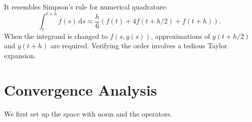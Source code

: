 \documentclass[10pt]{amsart}
\begin{document}
It resembles Simpson's rule for numerical quadrature:  
\[
\int_{t}^{t+h} f(s)\,\mathrm{d}s \approx \frac{h}{6} \left(f(t) + 4f(t+h/2) + f(t+h)\right).  
\]  
When the integrand is changed to $f(s, y(s))$, approximations of $y(t+h/2)$ and $y(t+h)$ are required. Verifying the order involves a tedious Taylor expansion.  

\section{Convergence Analysis}
We first set up the space with norm and the operators. 
\end{document}
